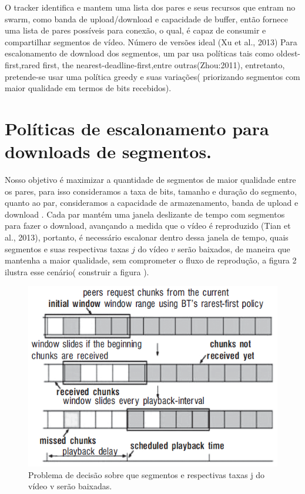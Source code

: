 \documentclass[
	12pt,
	oneside,
	a4paper,
	english,
	brazil
	]{abntex2ppgsi}
\begin{document}
O tracker identifica e mantem uma lista dos pares e seus recursos que entram no swarm, como banda de upload/download e capacidade de buffer, então fornece uma lista de pares possíveis para conexão, o qual, é capaz de consumir e compartilhar segmentos de vídeo.
Número de versões ideal (Xu et al., 2013)
Para escalonamento de download dos segmentos, um par usa políticas tais como oldest-first,rared first, the nearest-deadline-first,entre outras(Zhou:2011), entretanto, pretende-se usar uma política greedy e suas variações( priorizando segmentos com maior qualidade em termos de bits recebidos).



\section{Políticas de escalonamento para downloads de segmentos.}

Nosso objetivo é maximizar a quantidade de segmentos de maior qualidade entre os pares, para isso consideramos a taxa de bits, tamanho e duração do segmento, quanto ao par, consideramos a capacidade de armazenamento, banda de upload e download . Cada par mantém uma janela deslizante de tempo com segmentos para fazer o download, avançando a medida que o vídeo é reproduzido (Tian et al., 2013), portanto, é necessário escalonar dentro dessa janela de tempo, quais segmentos e suas respectivas taxas $j$ do vídeo $v$ serão baixados, de maneira que mantenha a maior qualidade, sem comprometer o fluxo de reprodução, a figura 2 ilustra esse cenário( construir a figura ).

\begin{figure}[H]%
	\centering
 	  \caption{Problema de decisão sobre que segmentos e respectivas taxas j do vídeo v serão baixadas.}
		\includegraphics{figuras/janeladetempo.png}
\end{figure}
\end{document}
